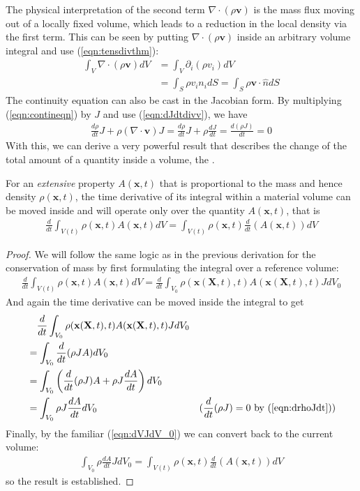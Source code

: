 The physical interpretation of the second term $\nabla \cdot(\rho\textbf{v})$ is the mass flux moving out of a locally fixed volume, which leads to a reduction in the local density via the first term. This can be seen by putting $\nabla \cdot(\rho\textbf{v})$ inside an arbitrary volume integral and use (\ref{eqn:tensdivthm}):
\begin{align}
\int_V \nabla \cdot(\rho\textbf{v}) dV &= \int_V \partial_i(\rho v_i) dV \nonumber \\
&= \int_S \rho v_i n_i dS = \int_S \rho\textbf{v} \cdot \hat{n} dS
\end{align}
The continuity equation can also be cast in the Jacobian form. By multiplying (\ref{eqn:contineqn}) by $J$ and use (\ref{eqn:dJdtdivv}), we have
\begin{align}
\frac{d\rho}{dt}J + \rho(\nabla \cdot \textbf{v})J = \frac{d\rho}{dt}J + \rho\frac{dJ}{dt} = \frac{d(\rho J)}{dt} = 0 \label{eqn:drhoJdt}
\end{align}
With this, we can derive a very powerful result that describes the change of the total amount of a quantity inside a volume, the .
\begin{thm}
\label{thm:RTT}
For an \textit{extensive} property $A(\textbf{x},t)$ that is proportional to the mass and hence density $\rho(\textbf{x},t)$, the time derivative of its integral within a material volume can be moved inside and will operate only over the quantity $A(\textbf{x},t)$, that is
\begin{align}
\frac{d}{dt} \int_{V(t)} \rho(\textbf{x},t)A(\textbf{x},t)dV = \int_{V(t)} \rho(\textbf{x},t)\frac{d}{dt}(A(\textbf{x},t))dV \label{eqn:RTT}
\end{align}
\end{thm}
\begin{proof}
We will follow the same logic as in the previous derivation for the conservation of mass by first formulating the integral over a reference volume:
\begin{align}
\frac{d}{dt} \int_{V(t)} \rho(\textbf{x},t)A(\textbf{x},t)dV = \frac{d}{dt} \int_{V_0} \rho(\textbf{x}(\textbf{X},t),t)A(\textbf{x}(\textbf{X},t),t)JdV_0  
\end{align}
And again the time derivative can be moved inside the integral to get
\begin{align}
&\quad \frac{d}{dt} \int_{V_0} \rho(\textbf{x}(\textbf{X},t),t)A(\textbf{x}(\textbf{X},t),t)JdV_0 \nonumber \\
&= \int_{V_0} \frac{d}{dt}(\rho J A) dV_0 \nonumber \\
&= \int_{V_0} \left(\frac{d}{dt}(\rho J)A + \rho J\frac{dA}{dt}\right) dV_0 \nonumber \\
&= \int_{V_0} \rho J\frac{dA}{dt} dV_0 & \text{($\frac{d}{dt}(\rho J) = 0$ by (\ref{eqn:drhoJdt}))}
\end{align}
Finally, by the familiar (\ref{eqn:dVJdV_0}) we can convert back to the current volume: 
\begin{align}
\int_{V_0} \rho \frac{dA}{dt} JdV_0 = \int_{V(t)} \rho(\textbf{x},t)\frac{d}{dt}(A(\textbf{x},t))dV 
\end{align}
so the result is established.
\end{proof}
